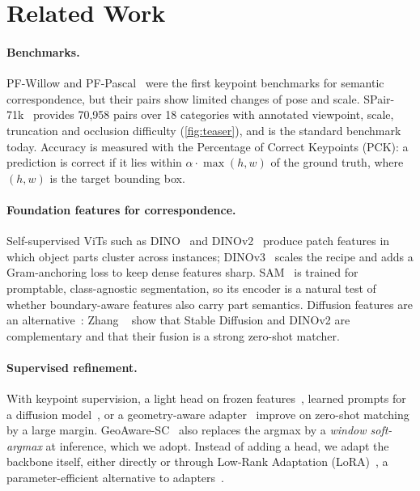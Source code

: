 \section{Related Work}
\label{sec:related}

\paragraph{Benchmarks.}
PF-Willow and PF-Pascal~\cite{ham2016proposal,ham2017proposal} were the first keypoint benchmarks for semantic correspondence, but their pairs show limited changes of pose and scale. SPair-71k~\cite{min2019spair} provides 70{,}958 pairs over 18 categories with annotated viewpoint, scale, truncation and occlusion difficulty (\cref{fig:teaser}), and is the standard benchmark today. Accuracy is measured with the Percentage of Correct Keypoints (PCK): a prediction is correct if it lies within $\alpha\cdot\max(h,w)$ of the ground truth, where $(h,w)$ is the target bounding box.

\paragraph{Foundation features for correspondence.}
Self-supervised ViTs such as DINO~\cite{caron2021emerging} and DINOv2~\cite{oquab2023dinov2} produce patch features in which object parts cluster across instances; DINOv3~\cite{simeoni2025dinov3} scales the recipe and adds a Gram-anchoring loss to keep dense features sharp. SAM~\cite{kirillov2023segment} is trained for promptable, class-agnostic segmentation, so its encoder is a natural test of whether boundary-aware features also carry part semantics. Diffusion features are an alternative~\cite{tang2023emergent}: Zhang \etal~\cite{zhang2023tale} show that Stable Diffusion and DINOv2 are complementary and that their fusion is a strong zero-shot matcher.

\paragraph{Supervised refinement.}
With keypoint supervision, a light head on frozen features~\cite{zhang2023tale}, learned prompts for a diffusion model~\cite{li2023sd4match}, or a geometry-aware adapter~\cite{zhang2024telling} improve on zero-shot matching by a large margin. GeoAware-SC~\cite{zhang2024telling} also replaces the argmax by a \emph{window soft-argmax} at inference, which we adopt. Instead of adding a head, we adapt the backbone itself, either directly or through Low-Rank Adaptation (LoRA)~\cite{hu2022lora}, a parameter-efficient alternative to adapters~\cite{houlsby2019parameter,chen2022adaptformer}.
